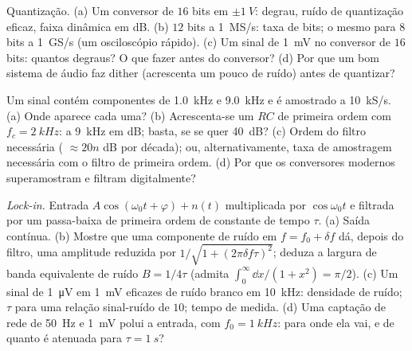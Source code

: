 \begin{exercise}[$\star\star$]\label{exo:b2:feedback-oscillators:8}
Quantização. (a) Um conversor de $16$ bits em $\pm\qty{1}{V}$: degrau, ruído
de quantização eficaz, faixa dinâmica em dB. (b) $12$ bits a
\qty{1}{MS/s}: taxa de bits; o mesmo para $8$ bits a \qty{1}{GS/s} (um osciloscópio
rápido). (c) Um sinal de \qty{1}{mV} no conversor de $16$ bits: quantos
degraus? O que fazer antes do conversor? (d) Por que um bom sistema de
áudio faz dither (acrescenta um pouco de ruído) antes de quantizar?
\end{exercise}

\begin{exercise}[$\star\star$]\label{exo:b2:feedback-oscillators:9}
Um sinal contém componentes de \qty{1.0}{kHz} e \qty{9.0}{kHz} e é
amostrado a \qty{10}{kS/s}. (a) Onde aparece cada uma? (b) Acrescenta-se um
 $RC$ de primeira ordem com $f_c = \qty{2}{kHz}$:
 a \qty{9}{kHz} em dB; basta, se se quer \qty{40}{dB}? (c)
Ordem do filtro necessária ( $\approx 20n$ dB por década); ou,
alternativamente, taxa de amostragem necessária com o filtro de primeira ordem. (d)
Por que os conversores modernos superamostram e filtram digitalmente?
\end{exercise}

\begin{exercise}[$\star\star\star$]\label{exo:b2:feedback-oscillators:10}
\emph{Lock-in.} Entrada $A\cos(\omega_0t + \varphi) + n(t)$ multiplicada por $\cos\omega_0t$
e filtrada por um passa-baixa de primeira ordem de constante de tempo $\tau$. (a) Saída
contínua. (b) Mostre que uma componente de ruído em $f = f_0 + \delta f$ dá, depois
do filtro, uma amplitude reduzida por $1/\sqrt{1 + (2\pi\delta f\tau)^2}$;
deduza a largura de banda equivalente de ruído $B = 1/4\tau$ (admita $\int_0^\infty
\dd x/(1 + x^2) = \pi/2$). (c) Um sinal de \qty{1}{\micro V} em \qty{1}{mV} eficazes de
ruído branco em \qty{10}{kHz}: densidade de ruído; $\tau$ para uma relação
sinal-ruído de $10$; tempo de medida. (d) Uma captação de rede de \qty{50}{Hz} e \qty{1}{mV}
polui a entrada, com $f_0 = \qty{1}{kHz}$: para onde ela vai, e de
quanto é atenuada para $\tau = \qty{1}{s}$?
\end{exercise}

